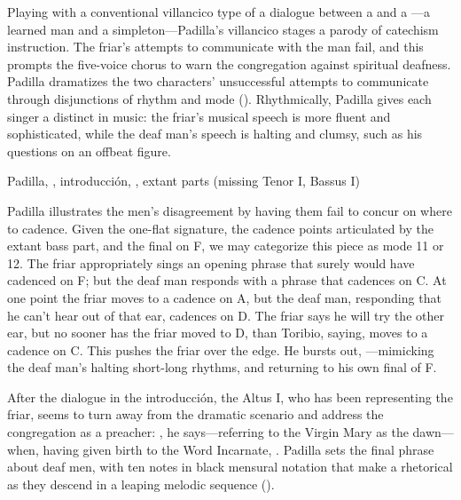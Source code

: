 Playing with a conventional villancico type of a dialogue between a  and a ---a learned man and a simpleton---Padilla's villancico stages a parody of catechism instruction.
The friar's attempts to communicate with the  man fail, and this prompts the five-voice chorus to warn the congregation against spiritual deafness.
Padilla dramatizes the two characters' unsuccessful attempts to communicate through disjunctions of rhythm and mode ().
Rhythmically, Padilla gives each singer a distinct  in music: the friar's musical speech is more fluent and sophisticated, while the deaf man's speech is halting and clumsy, such as his questions  on an offbeat figure.

\begin{exmusic}
    \caption{Padilla, , introducción, , extant parts (missing Tenor I, Bassus I)}
    \label{exmusic:Padilla-Sordo-intro}
\end{exmusic}

Padilla illustrates the men's disagreement by having them fail to concur on where to cadence.
Given the one-flat  signature, the cadence points articulated by the extant bass part, and the final on F, we may categorize this piece as mode 11 or 12.
The friar appropriately sings an opening phrase that surely would have cadenced on F; but the deaf man responds with a phrase that cadences on C.
At one point the friar moves to a cadence on A, but the deaf man, responding that he can't hear out of that ear, cadences on D.
The friar says he will try the other ear, but no sooner has the friar moved to D, than Toribio, saying,  moves to a cadence on C.
This pushes the friar over the edge.
He bursts out, ---mimicking the deaf man's halting short-long rhythms, and returning to his own final of F.

After the dialogue in the introducción, the Altus I, who has been representing the friar, seems to turn away from the dramatic scenario and address the congregation as a preacher: , he says---referring to the Virgin Mary as the dawn---when, having given birth to the Word Incarnate, .
Padilla sets the final phrase about deaf men, with ten notes in black mensural notation that make a rhetorical  as they descend in a leaping melodic sequence ().

